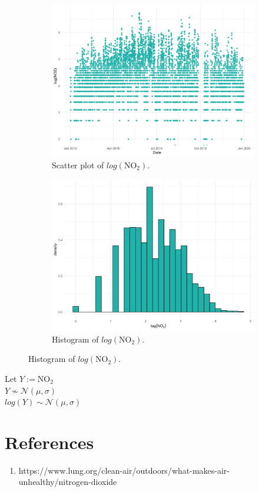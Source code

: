 \documentclass[a4paper, 10pt]{article}
\begin{document}
         \begin{figure}[H]
            \centering
            \begin{subfigure}[t]{0.48\linewidth}
               \centering
               \includegraphics[width=\linewidth]{../images/log_no2_scatter_2019.png}
               \caption{Scatter plot of $log(\text{NO}_{2})$.}
            \end{subfigure}
            \hfill
            \begin{subfigure}[t]{0.48\linewidth}
               \centering
               \includegraphics[width=\linewidth]{../images/log_no2_hist_2019.png}
               \caption{Histogram of $log(\text{NO}_{2})$.}
            \end{subfigure}
         \end{figure}
         Let $Y := \text{NO}_{2}$\\
         $Y  \not\sim \mathcal{N}(\mu, \sigma)$\\
         $log(Y) \sim \mathcal{N}(\mu, \sigma)$
   
   \section*{References}
      \begin{enumerate}
         \item https://www.lung.org/clean-air/outdoors/what-makes-air-unhealthy/nitrogen-dioxide
      \end{enumerate}
\end{document}

